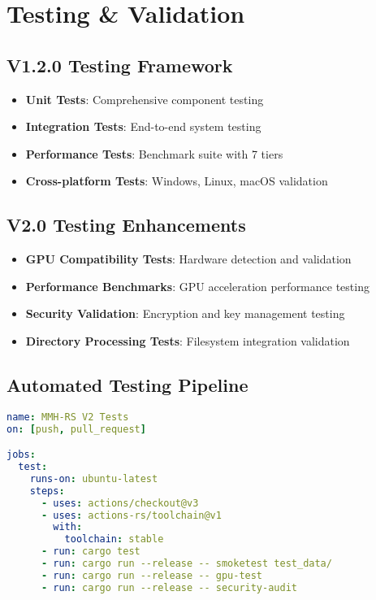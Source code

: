 \documentclass[12pt,a4paper]{article}
\begin{document}
\section{Testing \& Validation}

\subsection{V1.2.0 Testing Framework}
\begin{itemize}
    \item \textbf{Unit Tests}: Comprehensive component testing
    \item \textbf{Integration Tests}: End-to-end system testing
    \item \textbf{Performance Tests}: Benchmark suite with 7 tiers
    \item \textbf{Cross-platform Tests}: Windows, Linux, macOS validation
\end{itemize}

\subsection{V2.0 Testing Enhancements}
\begin{itemize}
    \item \textbf{GPU Compatibility Tests}: Hardware detection and validation
    \item \textbf{Performance Benchmarks}: GPU acceleration performance testing
    \item \textbf{Security Validation}: Encryption and key management testing
    \item \textbf{Directory Processing Tests}: Filesystem integration validation
\end{itemize}

\subsection{Automated Testing Pipeline}
\begin{lstlisting}[language=YAML, caption=CI/CD Pipeline Example]
name: MMH-RS V2 Tests
on: [push, pull_request]

jobs:
  test:
    runs-on: ubuntu-latest
    steps:
      - uses: actions/checkout@v3
      - uses: actions-rs/toolchain@v1
        with:
          toolchain: stable
      - run: cargo test
      - run: cargo run --release -- smoketest test_data/
      - run: cargo run --release -- gpu-test
      - run: cargo run --release -- security-audit
\end{lstlisting}
\end{document}
